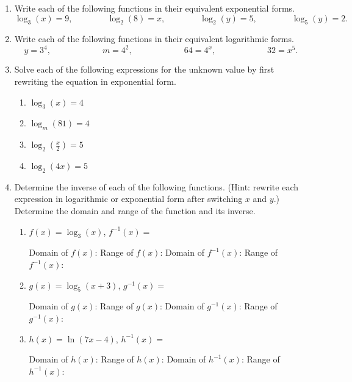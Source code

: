\begin{enumerate}
\item Write each of the following functions in their equivalent  exponential forms.
  $$\log_3(x)=9,   \quad \quad \quad \quad
  \log_2(8)=x,     \quad \quad \quad \quad
  \log_2(y)=5,     \quad \quad  \quad \quad
  \log_5(y)=2.$$
\vfill
\item Write each of the following functions in their equivalent  logarithmic forms.
  $$y=3^4,  \quad \quad \quad \quad \quad \quad
  m=4^2,    \quad \quad \quad \quad \quad \quad
  64=4^x,   \quad \quad \quad \quad  \quad \quad
  32=x^5.$$
\vfill
\item Solve each of the following expressions for the unknown value by
  first rewriting the equation in exponential form.
\begin{enumerate}
\item $\log_3(x)=4$
\vfill
\vfill
\item $\log_{m}(81)=4$
\vfill
\vfill
\item $\displaystyle \log_2\left(\frac{x}{2}\right)=5$
\vfill
\vfill
\item $\log_2(4x)=5$
\vfill
\vfill
\end{enumerate}



\clearpage
\item Determine the inverse of each of the following functions.
  (Hint: rewrite each expression in logarithmic or exponential form
  after switching $x$ and $y$.)  Determine the domain and range of the
  function and its inverse.
\begin{enumerate}
\item $f(x)=\log_3(x)$, \quad \quad \quad $f^{-1}(x)=$
\begin{flushright}
 Domain of $f(x)$:  \quad \quad \quad\quad\quad\quad Range of $f(x)$:\quad\quad\quad\quad \vfill
Domain of $f^{-1}(x)$:   \quad \quad\quad\quad\quad Range of $f^{-1}(x)$:\quad\quad\quad\quad
\end{flushright}
\vfill
\item $g(x)=\log_5(x+3)$,  \quad \quad \quad $g^{-1}(x)=$
\begin{flushright}
Domain of $g(x)$:  \quad \quad \quad\quad\quad\quad Range of $g(x)$:\quad\quad\quad\quad \vfill
Domain of $g^{-1}(x)$:   \quad \quad\quad\quad\quad Range of $g^{-1}(x)$:\quad\quad\quad\quad
\end{flushright}

\vfill 
\item $h(x)=\ln(7x-4)$,  \quad \quad \quad $h^{-1}(x)=$
\begin{flushright}
Domain of $h(x)$:  \quad \quad \quad\quad\quad\quad Range of $h(x)$:\quad\quad\quad\quad \vfill 
Domain of $h^{-1}(x)$:   \quad \quad\quad\quad\quad Range of $h^{-1}(x)$:\quad\quad\quad\quad
\end{flushright}


\end{enumerate}
\end{enumerate}
